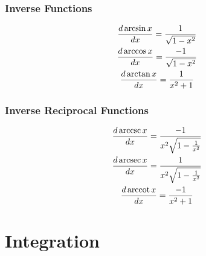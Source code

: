 \documentclass[12pt]{article}
\begin{document}
			\subsubsection{Inverse Functions}
				\begin{gather}
					\frac{d \arcsin x}{d x} = \frac{1}{\sqrt{1 -
					x^2}} \\
					\frac{d \arccos x}{d x} = \frac{-1}{\sqrt{1 -
					x^2}}  \\
					\frac{d \arctan x}{d x} = \frac{1}{x^2 + 1}
				\end{gather}
			\subsubsection{Inverse Reciprocal Functions}
				\newcommand{\arccsc}[0]{\,\text{arccsc}\,}
				\newcommand{\arcsec}[0]{\,\text{arcsec}\,}
				\newcommand{\arccot}[0]{\,\text{arccot}\,}
				\begin{gather}
					\deriv{\arccsc x} = \frac{-1}{x^2\sqrt{1
					- \frac{1}{x^2}}} \\
					\deriv{\arcsec x} = \frac{1}{x^2\sqrt{1
					- \frac{1}{x^2}}} \\
					\deriv{\arccot x} = \frac{-1}{x^2 + 1}
				\end{gather}
	\section{Integration}
\end{document}
